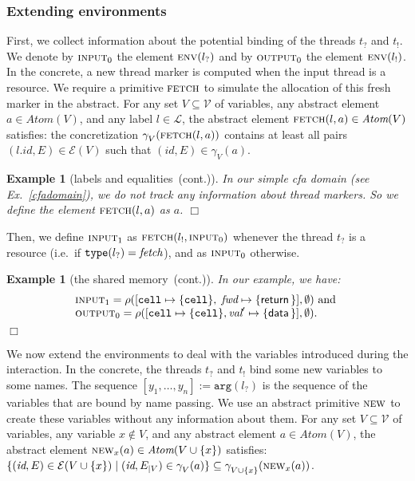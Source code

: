 \documentclass{article}
\newcommand{\bydef}{:=}
\newcommand{\boxexample}{$\Box$}
\newtheorem{example}[thm]{Example}
\newcommand{\Names}{\mathcal{V}}
\newcommand{\Labels}{\mathcal{L}}
\newcommand{\rec}{?}
\newcommand{\eme}{!}
\newcommand{\internal}[1]{\textnormal{\texttt{#1}}}
\newcommand{\data}[1]{\textsf{#1}\,}
\newcommand{\variable}[1]{\textit{#1}}
\newcommand{\cdata}{\data{data}}
\newcommand{\addread}{\data{return}}
\newcommand{\port}{\variable{fwd}}
\newcommand{\ccell}{\internal{cell}}
\newcommand{\datawrite}{\variable{val}'}
\newcommand{\type}{\texttt{type}}
\newcommand{\env}[1]{\mathcal{E}(#1)}
\newcommand{\fetch}{\emph{fetch}}
\newcommand{\args}{\texttt{arg}}
\newcommand{\lrec}{l_{\rec}}
\newcommand{\leme}{l_{\eme}}
\newcommand{\trec}{t_{\rec}}
\newcommand{\teme}{t_{\eme}}
\newcommand{\continued}{(cont.)}
\newcommand{\envf}{\textsc{env}}
\newcommand{\Atomekey}{\textit{Atom}}
\newcommand{\Atomeshortkey}{}
\newcommand{\Atome}[1]{\Atomekey(#1)}
\newcommand{\gammaatome}[1]{\gamma^{\Atomeshortkey}_{#1}}
\newcommand{\jfetchm}{{\textsc{fetch}}}
\newcommand{\fetchm}[2]{\jfetchm(#1,#2)}
\newcommand{\jextension}{\textsc{new}}
\newcommand{\extension}{\jextension}
\newcommand{\cfadomain}{labels and equalities}
\newcommand{\ccfadomain}{\cfadomain\ \continued}
\newcommand{\shareanalysis}{the shared memory}
\newcommand{\cflowanalysis}{\shareanalysis\ \continued}
\begin{document}
\subsubsection{Extending environments}
First, we collect information about the potential binding of the  threads $t_\rec$ and $t_\eme$. We denote by $\textsc{input}_0$ the element $\envf(\lrec)$ and by $\textsc{output}_0$ the element $\envf(\leme)$. 
In the concrete, a new thread marker is computed when the input thread is a resource. 
We require a primitive $\jfetchm$ to simulate the allocation of this fresh marker in the abstract. 
For any set $V\subseteq \Names$ of variables, any abstract element $a\in\Atome{V}$, and any label $l\in\Labels$, the abstract element $\fetchm{l}{a}\in\Atome{V}$ satisfies: the concretization $\gammaatome{V}(\fetchm{l}{a})$ 
contains at least all pairs $(l.\textit{id},E)\in \env{V}$ such that 
 $(\textit{id},E)\in\gammaatome{V}(a)$.

\begin{example}[\ccfadomain]
In our simple \emph{cfa} domain (see Ex.~\ref{cfadomain}), 
we do not track any information about thread markers.
So we define the element $\jfetchm(l,a)$ as $a$.
\boxexample\end{example}

Then, we define $\textsc{input}_1$ as $\fetchm{\leme}{\textsc{input}_0}$ whenever the thread $\trec$ is a resource (i.e.~if $\type(\lrec)=\fetch$), and 
 as $\textsc{input}_0$ otherwise.

\begin{example}[\cflowanalysis]
In our example, we have:
\begin{equation*}
\begin{array}{l}
 \textsc{input}_1 = \rho([\ccell  \mapsto \{\ccell\},\;\port  \mapsto\{\addread\}],\emptyset) \text{ and }\cr 
\textsc{output}_0 = \rho([\ccell \mapsto \{\ccell\}, \datawrite \mapsto \{\cdata\}],\emptyset).
\end{array}
\end{equation*}
\boxexample\end{example}

We now extend the environments to deal with the variables introduced during the interaction.
In the concrete, the threads $\trec$ and $\teme$  bind some new variables to some names. 
The sequence $[y_1,\ldots,y_n]\bydef\args(\lrec)$ is the sequence of the variables that are bound by name passing.
We use an abstract primitive $\extension$ to create these variables without any information about them. 
For any set $V\subseteq \Names$ of variables, any variable $x\not\in V$, and any abstract element $a\in\Atome{V}$, the abstract element $\extension_x(a)\in\Atome{V\cup \{x\}}$ satisfies: $\{(\textit{id},E)\in \env{V\cup \{x\}}\;|\;(\textit{id},E_{|V})\in\gammaatome{V}(a)\} \subseteq \gammaatome{V\cup \{x\}}(\extension_x(a))$. 
\end{document}
